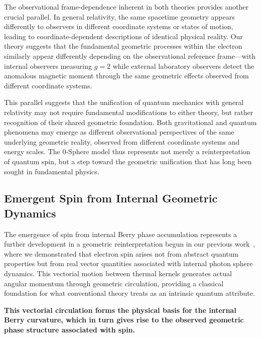 \documentclass[%
 reprint,
 amsmath,amssymb,
 aps,
]{revtex4-1}
\numberwithin{equation}{section}%
\begin{document}
The observational frame-dependence inherent in both theories provides another crucial parallel. In general relativity, the same spacetime geometry appears differently to observers in different coordinate systems or states of motion, leading to coordinate-dependent descriptions of identical physical reality. Our theory suggests that the fundamental geometric processes within the electron similarly appear differently depending on the observational reference frame—with internal observers measuring $g = 2$ while external laboratory observers detect the anomalous magnetic moment through the same geometric effects observed from different coordinate systems.

This parallel suggests that the unification of quantum mechanics with general relativity may not require fundamental modifications to either theory, but rather recognition of their shared geometric foundation. Both gravitational and quantum phenomena may emerge as different observational perspectives of the same underlying geometric reality, observed from different coordinate systems and energy scales. The 0-Sphere model thus represents not merely a reinterpretation of quantum spin, but a step toward the geometric unification that has long been sought in fundamental physics.


\subsection{Emergent Spin from Internal Geometric Dynamics} \label{subsec:emergent_spin}

The emergence of spin from internal Berry phase accumulation represents a further development in a geometric reinterpretation begun in our previous work~\cite{hanamura2506.0072}, where we demonstrated that electron spin arises not from abstract quantum properties but from real vector quantities associated with internal photon sphere dynamics. This vectorial motion between thermal kernels generates actual angular momentum through geometric circulation, providing a classical foundation for what conventional theory treats as an intrinsic quantum attribute.

\textbf{This vectorial circulation forms the physical basis for the internal Berry curvature, which in turn gives rise to the observed geometric phase structure associated with spin.}
\end{document}
